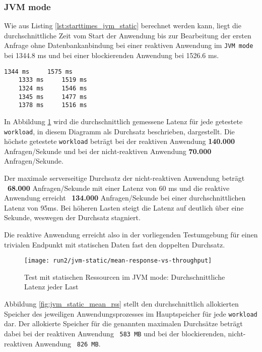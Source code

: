 \subsubsection{JVM mode}
\label{subsubsec:static_jvm_mode}
Wie aus Listing \ref{lst:starttimes_jvm_static} berechnet werden kann, liegt die durchschnittliche Zeit vom Start der Anwendung bis zur
Bearbeitung der ersten Anfrage ohne Datenbankanbindung bei einer reaktiven Anwendung im \verb|JVM mode| bei 1344.8 ms und bei einer
blockierenden Anwendung bei 1526.6 ms.
\begin{lstlisting}[caption=5 gemessene Startzeiten bis zur Bearbeitung der ersten Anfrage: links ist die reaktive Anwendung und rechts
    die blockierende Anwendung, captionpos=b, label=lst:starttimes_jvm_static]
    1344 ms     1575 ms
    1333 ms     1519 ms
    1324 ms     1546 ms
    1345 ms     1477 ms
    1378 ms     1516 ms
\end{lstlisting}

In Abbildung \ref{fig:jvm_static_mean_response} wird die durchschnittlich gemessene Latenz für jede getestete \verb|workload|,
in diesem Diagramm als Durchsatz beschrieben, dargestellt.
Die höchste getestete \verb|workload| beträgt bei der reaktiven Anwendung \textbf{140.000} Anfragen/Sekunde und bei der
nicht-reaktiven Anwendung \textbf{70.000} Anfragen/Sekunde.

Der maximale serverseitige Durchsatz der nicht-reaktiven Anwendung beträgt ~\textbf{68.000} Anfragen/Sekunde mit einer
Latenz von 60 ms und
die reaktive Anwendung erreicht ~\textbf{134.000} Anfragen/Sekunde bei einer durchschnittlichen Latenz von 95ms.
Bei höheren Lasten steigt die Latenz auf deutlich über eine Sekunde, weswegen der Durchsatz stagniert.

Die reaktive Anwendung erreicht also in der vorliegenden Testumgebung für einen trivialen
Endpunkt mit statischen Daten fast den doppelten Durchsatz.
\newpage
\begin{figure}[ht!]
    \centering
    \texttt{[image: run2/jvm-static/mean-response-vs-throughput]}
    \caption{Test mit statischen Ressourcen im JVM mode: Durchschnittliche Latenz jeder Last}
    \label{fig:jvm_static_mean_response}
\end{figure}

Abbildung \ref{fig:jvm_static_mean_rss} stellt den durchschnittlich allokierten Speicher des jeweiligen Anwendungsprozesses im Hauptspeicher
für jede \verb|workload| dar. Der allokierte Speicher für die genannten maximalen Durchsätze
beträgt dabei bei der reaktiven Anwendung ~\verb|583 MB| und bei der
blockierenden, nicht-reaktiven Anwendung ~\verb|826 MB|.

